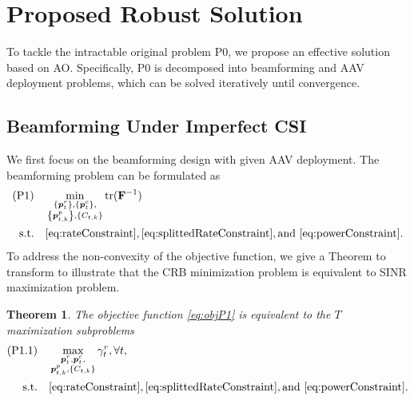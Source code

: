 \documentclass[twocolumn,journal]{IEEEtran}
\newtheorem{theorem}{\textbf{Theorem}}
\begin{document}
\section{Proposed Robust Solution}
To tackle the intractable original problem P0, we propose an effective solution based on AO. Specifically, P0 is decomposed into beamforming and AAV deployment problems, which can be solved iteratively until convergence.
\subsection{Beamforming Under Imperfect CSI}
We first focus on the beamforming design with given AAV deployment. The beamforming problem can be formulated as
\begin{align}
    (\text{P1})\quad&\min_{
        \substack{\left\{\boldsymbol{p}^{r}_{t}\right\},\left\{\boldsymbol{p}^{c}_{t}\right\},\\
    \left\{\boldsymbol{p}^{p}_{t,k}\right\},\left\{C_{t,k}
    \right\}}
    } \text{tr}(\mathbf{F}^{-1})\label{eq:objP1}\\
    \text{s.t.}\quad& \eqref{eq:rateConstraint}, \eqref{eq:splittedRateConstraint}, \text{and } \eqref{eq:powerConstraint}.\notag
\end{align}
To address the non-convexity of the objective function, we give a Theorem to transform to illustrate that the CRB minimization problem is equivalent to SINR maximization problem.
\begin{theorem}
    The objective function \eqref{eq:objP1} is equivalent to the \(T\) maximization subproblems
    \begin{align}
        (\text{P1.1})\quad&\mathop{\max}_{\substack{\boldsymbol{p}^{r}_{t},\boldsymbol{p}^{c}_{t},\\
        \boldsymbol{p}^{p}_{t,k},\left\{C_{t,k}\right\}}}\gamma_t^{r}, \forall t,\\
        \text{s.t.}\quad& \eqref{eq:rateConstraint}, \eqref{eq:splittedRateConstraint}, \text{and } \eqref{eq:powerConstraint}.\notag
    \end{align}
\end{theorem}
\end{document}
